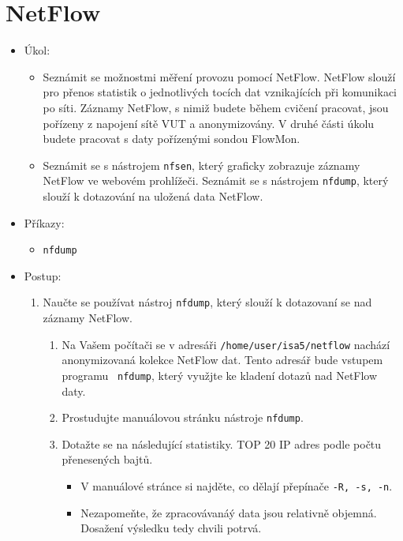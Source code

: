 \section{NetFlow}
  \begin{itemize}
    \item Úkol:
        \begin{itemize}
            \item Seznámit se možnostmi měření provozu pomocí NetFlow. NetFlow slouží pro
            přenos statistik o jednotlivých tocích dat vznikajících při komunikaci po síti.
            Záznamy NetFlow, s nimiž budete během cvičení pracovat, jsou
            pořízeny z napojení sítě VUT a anonymizovány. V druhé části úkolu
            budete pracovat s daty pořízenými sondou FlowMon.
            \item Seznámit se s nástrojem {\tt nfsen}, který graficky zobrazuje záznamy
            NetFlow ve webovém prohlížeči. Seznámit se s nástrojem {\tt nfdump}, který slouží k dotazování na uložená data NetFlow.
        \end{itemize}
    \item Příkazy:
        \begin{itemize}
            \item {\tt nfdump}
        \end{itemize}
    \item Postup:
        \begin{enumerate}
            \item Naučte se používat nástroj {\tt nfdump}, který slouží k dotazovaní se nad záznamy NetFlow.
                \begin{enumerate}
                    \item Na Vašem počítači se v adresáři {\tt /home/user/isa5/netflow} nachází
                    anonymizovaná kolekce NetFlow dat. Tento adresář bude vstupem programu {\tt
                    nfdump}, který využjte ke kladení dotazů nad NetFlow daty.
                    \item Prostudujte manuálovou stránku nástroje {\tt nfdump}.
                    \item Dotažte se na následující statistiky. TOP 20 IP adres podle počtu přenesených bajtů. 
                        \begin{itemize}
                            \item V manuálové stránce si najděte, co dělají přepínače {\tt -R, -s, -n}.
                            \item Nezapomeňte, že zpracovávanáý data jsou relativně objemná. Dosažení výsledku tedy chvili potrvá.

\end{itemize}
\end{enumerate}
\end{enumerate}
\end{itemize}
